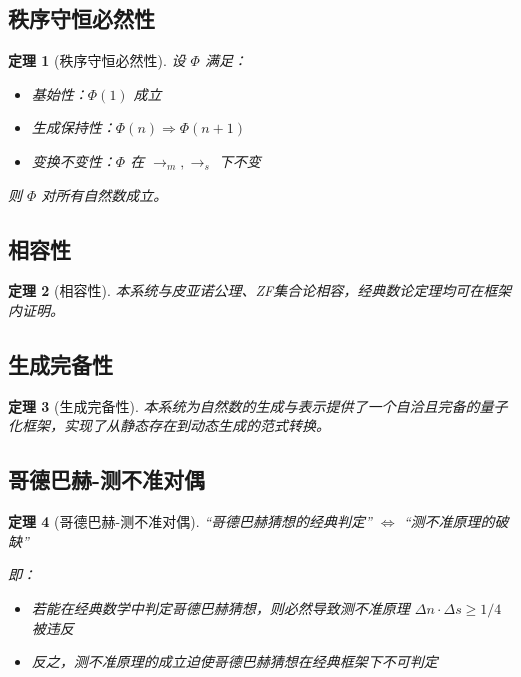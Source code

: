 \documentclass[12pt]{article}
\newtheorem{theorem}{定理}[section]
\theoremstyle{definition}
\begin{document}
\subsection{秩序守恒必然性}

\begin{theorem}[秩序守恒必然性]
设 \(\Phi\) 满足：
\begin{itemize}
    \item 基始性：\(\Phi(1)\) 成立
    \item 生成保持性：\(\Phi(n) \Rightarrow \Phi(n+1)\)
    \item 变换不变性：\(\Phi\) 在 \(\rightarrow_m, \rightarrow_s\) 下不变
\end{itemize}
则 \(\Phi\) 对所有自然数成立。
\end{theorem}

\subsection{相容性}

\begin{theorem}[相容性]
本系统与皮亚诺公理、ZF集合论相容，经典数论定理均可在框架内证明。
\end{theorem}

\subsection{生成完备性}

\begin{theorem}[生成完备性]
本系统为自然数的生成与表示提供了一个自洽且完备的量子化框架，实现了从静态存在到动态生成的范式转换。
\end{theorem}

\subsection{哥德巴赫-测不准对偶}

\begin{theorem}[哥德巴赫-测不准对偶]
“哥德巴赫猜想的经典判定” \(\Longleftrightarrow\) “测不准原理的破缺”

即：
\begin{itemize}
    \item 若能在经典数学中判定哥德巴赫猜想，则必然导致测不准原理 \(\Delta n \cdot \Delta s \geq 1/4\) 被违反
    \item 反之，测不准原理的成立迫使哥德巴赫猜想在经典框架下不可判定
\end{itemize}
\end{theorem}
\end{document}
